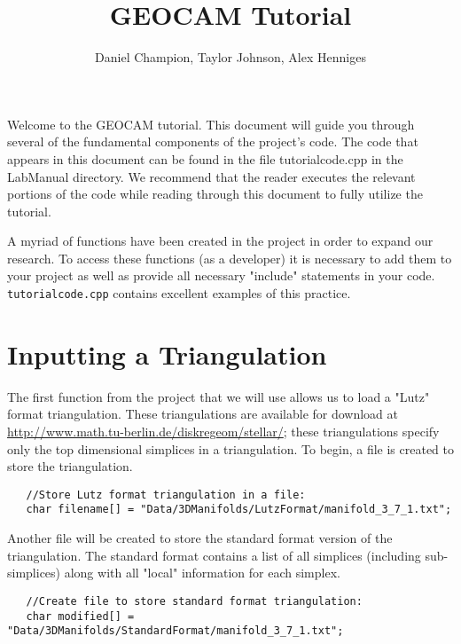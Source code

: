 \documentclass{amsart}
\theoremstyle{plain}
\numberwithin{equation}{section}
\begin{document}
\title{GEOCAM Tutorial}
\author{Daniel Champion, Taylor Johnson, Alex Henniges}
\maketitle

Welcome to the GEOCAM tutorial. This document will guide you through
several of the fundamental components of the project's code. The code that
appears in this document can be found in the file tutorialcode.cpp in the
LabManual directory. We recommend that the reader executes the relevant
portions of the code while reading through this document to fully utilize
the tutorial.

A myriad of functions have been created in the project in order to expand
our research. To access these functions (as a developer) it is necessary
to add them to your project as well as provide all necessary "include"
statements in your code. \texttt{tutorialcode.cpp} contains excellent
examples of this practice.

\section*{Inputting a Triangulation}

The first function from the project that we will use allows us to load a
"Lutz" format triangulation. These triangulations are available for
download at \url{http://www.math.tu-berlin.de/diskregeom/stellar/}; these
triangulations specify only the top dimensional simplices in a
triangulation. To begin, a file is created to store the triangulation.%
\newline
\begin{verbatim}
   //Store Lutz format triangulation in a file:
   char filename[] = "Data/3DManifolds/LutzFormat/manifold_3_7_1.txt";
\end{verbatim}

\bigskip

Another file will be created to store the standard format version of the
triangulation. The standard format contains a list of all simplices
(including sub-simplices) along with all "local" information for each
simplex.\newline
\begin{verbatim}
   //Create file to store standard format triangulation:
   char modified[] = "Data/3DManifolds/StandardFormat/manifold_3_7_1.txt";
\end{verbatim}

\bigskip
\end{document}

